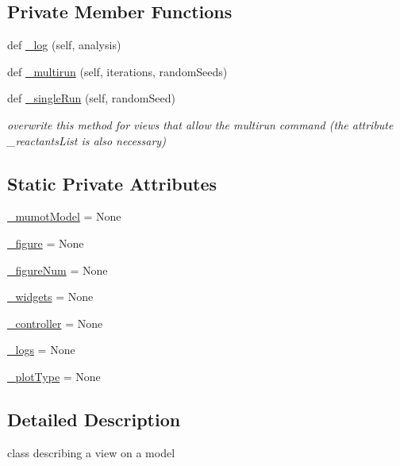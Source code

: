 \subsection*{Private Member Functions}
\begin{DoxyCompactItemize}
\item 
def \hyperlink{class_mu_mo_t_1_1_mu_mo_tview_a8b4ffd0e4999bd45c6ca33fe0f40d1e3}{\+\_\+log} (self, analysis)
\item 
def \hyperlink{class_mu_mo_t_1_1_mu_mo_tview_a4d4a00545816bf68f912f5ea5a449c48}{\+\_\+multirun} (self, iterations, random\+Seeds)
\item 
def \hyperlink{class_mu_mo_t_1_1_mu_mo_tview_a51d421aacb4cd83af5f1c2e60c3dff9c}{\+\_\+single\+Run} (self, random\+Seed)
\begin{DoxyCompactList}\small\item\em overwrite this method for views that allow the \textquotesingle{}multirun\textquotesingle{} command (the attribute \+\_\+reactants\+List is also necessary) \end{DoxyCompactList}\end{DoxyCompactItemize}
\subsection*{Static Private Attributes}
\begin{DoxyCompactItemize}
\item 
\hyperlink{class_mu_mo_t_1_1_mu_mo_tview_aeacd9541246371f0db5cc3e3779762fa}{\+\_\+mumot\+Model} = None
\item 
\hyperlink{class_mu_mo_t_1_1_mu_mo_tview_abf6d9f6be3898e307415d4598cde264d}{\+\_\+figure} = None
\item 
\hyperlink{class_mu_mo_t_1_1_mu_mo_tview_a5748371a5f2e09033908d21bb12f94c0}{\+\_\+figure\+Num} = None
\item 
\hyperlink{class_mu_mo_t_1_1_mu_mo_tview_a397d0ee37a222317a1bab7deb1270a13}{\+\_\+widgets} = None
\item 
\hyperlink{class_mu_mo_t_1_1_mu_mo_tview_a15f56ca9811d1e67d721fa64f9b0dc1e}{\+\_\+controller} = None
\item 
\hyperlink{class_mu_mo_t_1_1_mu_mo_tview_ac0ad5d0ca27f2668c0676334ee73ff52}{\+\_\+logs} = None
\item 
\hyperlink{class_mu_mo_t_1_1_mu_mo_tview_a5feff4ca83ee97d6e09874496a4975d4}{\+\_\+plot\+Type} = None
\end{DoxyCompactItemize}


\subsection{Detailed Description}
class describing a view on a model 

